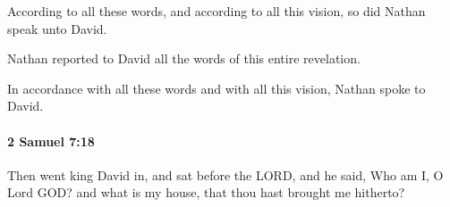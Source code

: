 			\begin{versebox}
					\item[BHS] 
					\item[ASV] According to all these words, and according to all this vision, so did Nathan speak unto David.
					\item[NIV] Nathan reported to David all the words of this entire revelation.
					\item[NRSV] In accordance with all these words and with all this vision, Nathan spoke to David.
			\end{versebox}

		\paragraph{2 Samuel 7:18} %
			\label{2SAMUEL-7-18}

			Then went king David in, and sat before the LORD, and he said, Who am I, O Lord GOD? and what is my house, that thou hast brought me hitherto?

